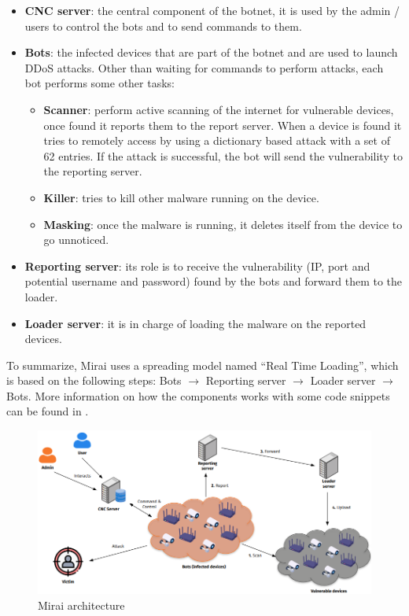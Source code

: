 \begin{itemize}
    \item \textbf{CNC server}: the central component of the botnet, it is used by the admin / users to control the bots and to send commands to them.
    \item \textbf{Bots}: the infected devices that are part of the botnet and are used to launch DDoS attacks. Other than waiting for commands to perform attacks, each bot performs some other tasks:
    \begin{itemize}
        \item \textbf{Scanner}: perform active scanning of the internet for vulnerable devices, once found it reports them to the report server. When a device is found it tries to remotely access by using a dictionary based attack with a set of 62 entries. If the attack is successful, the bot will send the vulnerability to the reporting server.
        \item \textbf{Killer}: tries to kill other malware running on the device.
        \item \textbf{Masking}: once the malware is running, it deletes itself from the device to go unnoticed.
    \end{itemize}
    \item \textbf{Reporting server}: its role is to receive the vulnerability (IP, port and potential username and password) found by the bots and forward them to the loader. 
    \item \textbf{Loader server}: it is in charge of loading the malware on the reported devices. 
\end{itemize}

To summarize, Mirai uses a spreading model named ``Real Time Loading'', which is based on the following steps: Bots $\rightarrow$ Reporting server $\rightarrow$ Loader server $\rightarrow$ Bots. \cite{de2018ddos} More information on how the components works with some code snippets can be found in .


\begin{figure}[ht]
    \centering
    \includegraphics[scale=0.5]{resources/images/mirai-architecture.png}
    \caption{Mirai architecture}
    \label{fig:mirai-architecture}
\end{figure}